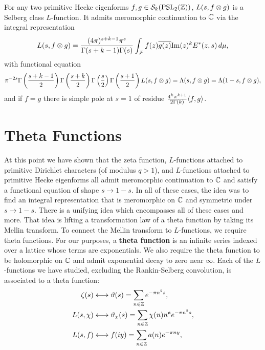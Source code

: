       \begin{theorem}
        For any two primitive Hecke eigenforms $f,g \in \mathcal{S}_{k}(\mathrm{PSL}_{2}(\mathbb{Z}))$, $L(s,f \otimes g)$ is a Selberg class $L$-function. It admits meromorphic continuation to $\mathbb{C}$ via the integral representation
        \[
          L(s,f \otimes g) = \frac{(4\pi)^{s+k-1}\pi^{s}}{\Gamma(s+k-1)\Gamma(s)}\int_{\mathcal{F}}f(z)\overline{g(z)}\mathrm{Im}(z)^{k}E^{\ast}(z,s)\,d\mu,
        \]
        with functional equation
        \[
          \pi^{-2s}\Gamma\left(\frac{s+k-1}{2}\right)\Gamma\left(\frac{s+k}{2}\right)\Gamma\left(\frac{s}{2}\right)\Gamma\left(\frac{s+1}{2}\right)L(s,f \otimes g) = \Lambda(s,f \otimes g) = \Lambda(1-s,f \otimes g),
        \]
        and if $f = g$ there is simple pole at $s = 1$ of residue $\frac{4^{k}\pi^{k+1}}{2\Gamma(k)}\langle f,g\rangle$.
      \end{theorem}
  \section{Theta Functions}
    At this point we have shown that the zeta function, $L$-functions attached to primitive Dirichlet characters (of modulus $q > 1$), and $L$-functions attached to primitive Hecke eigenforms all admit meromorphic continuation to $\mathbb{C}$ and satisfy a functional equation of shape $s \to 1-s$. In all of these cases, the idea was to find an integral representation that is meromorphic on $\mathbb{C}$ and symmetric under $s \to 1-s$. There is a unifying idea which encompasses all of these cases and more. That idea is lifting a transformation law of a theta function by taking its Mellin transform. To connect the Mellin transform to $L$-functions, we require theta functions. For our purposes, a \textbf{theta function} is an infinite series indexed over a lattice whose terms are exponentials. We also require the theta function to be holomorphic on $\mathbb{C}$ and admit exponential decay to zero near $\infty$. Each of the $L$-functions we have studied, excluding the Rankin-Selberg convolution, is associated to a theta function:
    \begin{align*}
      \zeta(s) &\longleftrightarrow \vartheta(s) = \sum_{n \in \mathbb{Z}}e^{-\pi n^{2}s}, \\
      L(s,\chi) &\longleftrightarrow \vartheta_{\chi}(s) = \sum_{n \in \mathbb{Z}}\chi(n)n^{\mathfrak{a}}e^{-\pi n^{2}s}, \\
      L(s,f) &\longleftrightarrow f(iy) = \sum_{n \in \mathbb{Z}}a(n)e^{-\pi ny},
    \end{align*}
